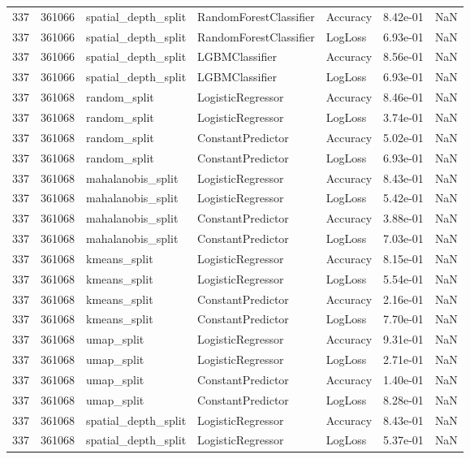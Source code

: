 \begin{tabular}{rrlllrr}
337 & 361066 & spatial\_depth\_split & RandomForestClassifier & Accuracy & 8.42e-01 & NaN \\
337 & 361066 & spatial\_depth\_split & RandomForestClassifier & LogLoss & 6.93e-01 & NaN \\
337 & 361066 & spatial\_depth\_split & LGBMClassifier & Accuracy & 8.56e-01 & NaN \\
337 & 361066 & spatial\_depth\_split & LGBMClassifier & LogLoss & 6.93e-01 & NaN \\
337 & 361068 & random\_split & LogisticRegressor & Accuracy & 8.46e-01 & NaN \\
337 & 361068 & random\_split & LogisticRegressor & LogLoss & 3.74e-01 & NaN \\
337 & 361068 & random\_split & ConstantPredictor & Accuracy & 5.02e-01 & NaN \\
337 & 361068 & random\_split & ConstantPredictor & LogLoss & 6.93e-01 & NaN \\
337 & 361068 & mahalanobis\_split & LogisticRegressor & Accuracy & 8.43e-01 & NaN \\
337 & 361068 & mahalanobis\_split & LogisticRegressor & LogLoss & 5.42e-01 & NaN \\
337 & 361068 & mahalanobis\_split & ConstantPredictor & Accuracy & 3.88e-01 & NaN \\
337 & 361068 & mahalanobis\_split & ConstantPredictor & LogLoss & 7.03e-01 & NaN \\
337 & 361068 & kmeans\_split & LogisticRegressor & Accuracy & 8.15e-01 & NaN \\
337 & 361068 & kmeans\_split & LogisticRegressor & LogLoss & 5.54e-01 & NaN \\
337 & 361068 & kmeans\_split & ConstantPredictor & Accuracy & 2.16e-01 & NaN \\
337 & 361068 & kmeans\_split & ConstantPredictor & LogLoss & 7.70e-01 & NaN \\
337 & 361068 & umap\_split & LogisticRegressor & Accuracy & 9.31e-01 & NaN \\
337 & 361068 & umap\_split & LogisticRegressor & LogLoss & 2.71e-01 & NaN \\
337 & 361068 & umap\_split & ConstantPredictor & Accuracy & 1.40e-01 & NaN \\
337 & 361068 & umap\_split & ConstantPredictor & LogLoss & 8.28e-01 & NaN \\
337 & 361068 & spatial\_depth\_split & LogisticRegressor & Accuracy & 8.43e-01 & NaN \\
337 & 361068 & spatial\_depth\_split & LogisticRegressor & LogLoss & 5.37e-01 & NaN \\

\end{tabular}
